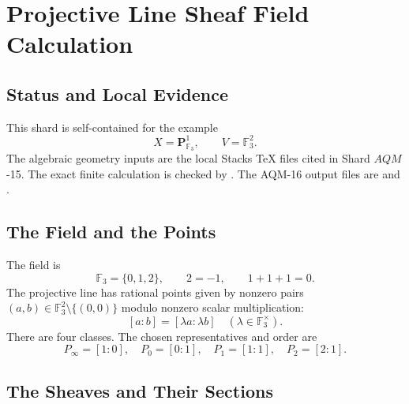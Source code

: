 
\section{Projective Line Sheaf Field Calculation}
\label{sec:projective-line-sheaf-field-calculation}

\subsection{Status and Local Evidence}

This shard is self-contained for the example
\[
  X=\mathbf P^1_{\mathbb F_3},\qquad V=\mathbb F_3^2.
\]
The algebraic geometry inputs are the local Stacks TeX files cited in
Shard \(AQM\)-15.  The exact finite calculation is checked by
.  The AQM-16 output
files are
and
.

\subsection{The Field and the Points}

The field is
\[
  \mathbb F_3=\{0,1,2\},\qquad 2=-1,\qquad 1+1+1=0.
\]
The projective line has rational points given by nonzero pairs
\((a,b)\in\mathbb F_3^2\setminus\{(0,0)\}\) modulo nonzero scalar
multiplication:
\[
  [a:b]=[\lambda a:\lambda b]\quad(\lambda\in\mathbb F_3^\times).
\]
There are four classes.  The chosen representatives and order are
\[
  P_\infty=[1:0],\quad P_0=[0:1],\quad P_1=[1:1],\quad P_2=[2:1].
\]

\subsection{The Sheaves and Their Sections}

